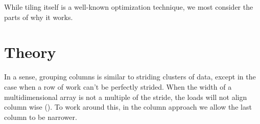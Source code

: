 
While tiling itself is a well-known optimization technique, we most consider the parts of why it works.

\TODO{\dots}

\section{Theory}

In a sense, grouping columns is similar to striding clusters of data, except in the case when a row of work can't be perfectly strided.
When the width of a multidimensional array is not a multiple of the stride, the loads will not align column wise ().
To work around this, in the column approach we allow the last column to be narrower.

